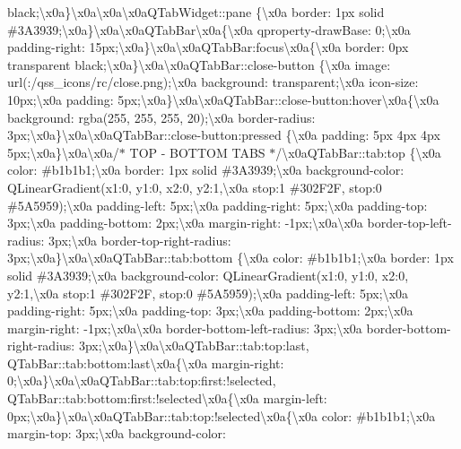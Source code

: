 \begin{DoxyCompactItemize}
black;\textbackslash{}x0a\}\textbackslash{}x0a\textbackslash{}x0a\textbackslash{}x0a\+Q\+Tab\+Widget\+::pane \{\textbackslash{}x0a border\+: 1px solid \#3\+A3939;\textbackslash{}x0a\}\textbackslash{}x0a\textbackslash{}x0a\+Q\+Tab\+Bar\textbackslash{}x0a\{\textbackslash{}x0a qproperty-\/draw\+Base\+: 0;\textbackslash{}x0a padding-\/right\+: 15px;\textbackslash{}x0a\}\textbackslash{}x0a\textbackslash{}x0a\+Q\+Tab\+Bar\+:focus\textbackslash{}x0a\{\textbackslash{}x0a border\+: 0px transparent black;\textbackslash{}x0a\}\textbackslash{}x0a\textbackslash{}x0a\+Q\+Tab\+Bar\+::close-\/button \{\textbackslash{}x0a image\+: url(\+:/qss\+\_\+icons/rc/close.\+png);\textbackslash{}x0a background\+: transparent;\textbackslash{}x0a icon-\/size\+: 10px;\textbackslash{}x0a padding\+: 5px;\textbackslash{}x0a\}\textbackslash{}x0a\textbackslash{}x0a\+Q\+Tab\+Bar\+::close-\/button\+:hover\textbackslash{}x0a\{\textbackslash{}x0a background\+: rgba(255, 255, 255, 20);\textbackslash{}x0a border-\/radius\+: 3px;\textbackslash{}x0a\}\textbackslash{}x0a\textbackslash{}x0a\+Q\+Tab\+Bar\+::close-\/button\+:pressed \{\textbackslash{}x0a padding\+: 5px 4px 4px 5px;\textbackslash{}x0a\}\textbackslash{}x0a\textbackslash{}x0a/$\ast$ T\+O\+P -\/ B\+O\+T\+T\+O\+M T\+A\+B\+S $\ast$/\textbackslash{}x0a\+Q\+Tab\+Bar\+::tab\+:top \{\textbackslash{}x0a color\+: \#b1b1b1;\textbackslash{}x0a border\+: 1px solid \#3\+A3939;\textbackslash{}x0a background-\/color\+: Q\+Linear\+Gradient(x1\+:0, y1\+:0, x2\+:0, y2\+:1,\textbackslash{}x0a stop\+:1 \#302\+F2\+F, stop\+:0 \#5\+A5959);\textbackslash{}x0a padding-\/left\+: 5px;\textbackslash{}x0a padding-\/right\+: 5px;\textbackslash{}x0a padding-\/top\+: 3px;\textbackslash{}x0a padding-\/bottom\+: 2px;\textbackslash{}x0a margin-\/right\+: -\/1px;\textbackslash{}x0a\textbackslash{}x0a border-\/top-\/left-\/radius\+: 3px;\textbackslash{}x0a border-\/top-\/right-\/radius\+: 3px;\textbackslash{}x0a\}\textbackslash{}x0a\textbackslash{}x0a\+Q\+Tab\+Bar\+::tab\+:bottom \{\textbackslash{}x0a color\+: \#b1b1b1;\textbackslash{}x0a border\+: 1px solid \#3\+A3939;\textbackslash{}x0a background-\/color\+: Q\+Linear\+Gradient(x1\+:0, y1\+:0, x2\+:0, y2\+:1,\textbackslash{}x0a stop\+:1 \#302\+F2\+F, stop\+:0 \#5\+A5959);\textbackslash{}x0a padding-\/left\+: 5px;\textbackslash{}x0a padding-\/right\+: 5px;\textbackslash{}x0a padding-\/top\+: 3px;\textbackslash{}x0a padding-\/bottom\+: 2px;\textbackslash{}x0a margin-\/right\+: -\/1px;\textbackslash{}x0a\textbackslash{}x0a border-\/bottom-\/left-\/radius\+: 3px;\textbackslash{}x0a border-\/bottom-\/right-\/radius\+: 3px;\textbackslash{}x0a\}\textbackslash{}x0a\textbackslash{}x0a\+Q\+Tab\+Bar\+::tab\+:top\+:last, Q\+Tab\+Bar\+::tab\+:bottom\+:last\textbackslash{}x0a\{\textbackslash{}x0a margin-\/right\+: 0;\textbackslash{}x0a\}\textbackslash{}x0a\textbackslash{}x0a\+Q\+Tab\+Bar\+::tab\+:top\+:first\+:!selected, Q\+Tab\+Bar\+::tab\+:bottom\+:first\+:!selected\textbackslash{}x0a\{\textbackslash{}x0a margin-\/left\+: 0px;\textbackslash{}x0a\}\textbackslash{}x0a\textbackslash{}x0a\+Q\+Tab\+Bar\+::tab\+:top\+:!selected\textbackslash{}x0a\{\textbackslash{}x0a color\+: \#b1b1b1;\textbackslash{}x0a margin-\/top\+: 3px;\textbackslash{}x0a background-\/color\+: 
\end{DoxyCompactItemize}
